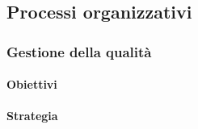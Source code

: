 \subsection{Processi organizzativi}
	\subsubsection{Gestione della qualità}
		\paragraph{Obiettivi}
		\paragraph{Strategia}